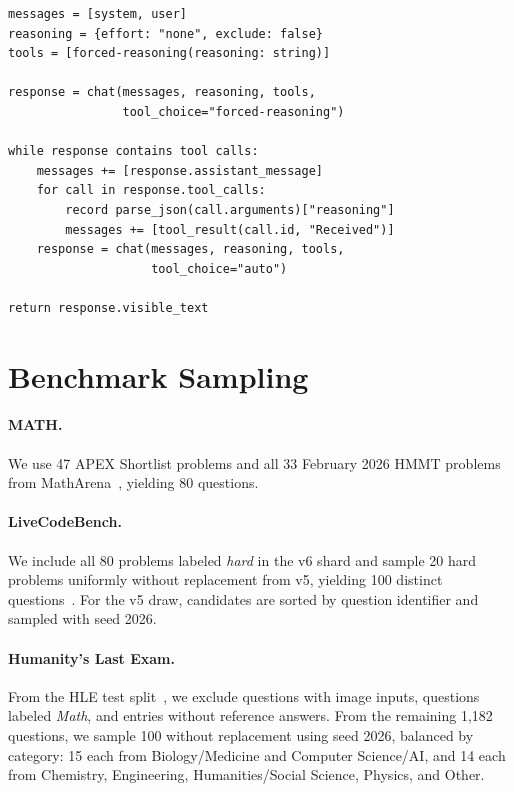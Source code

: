 \begin{tcolorbox}[breakable,colback=black!2,colframe=black!35,
  title={Forced-reasoning protocol (pseudocode)},fonttitle=\bfseries,
  fontupper=\small,before upper={\setlength{\parindent}{0pt}}]
\begin{verbatim}
messages = [system, user]
reasoning = {effort: "none", exclude: false}
tools = [forced-reasoning(reasoning: string)]

response = chat(messages, reasoning, tools,
                tool_choice="forced-reasoning")

while response contains tool calls:
    messages += [response.assistant_message]
    for call in response.tool_calls:
        record parse_json(call.arguments)["reasoning"]
        messages += [tool_result(call.id, "Received")]
    response = chat(messages, reasoning, tools,
                    tool_choice="auto")

return response.visible_text
\end{verbatim}
\end{tcolorbox}

\section{Benchmark Sampling}
\label{app:eval-details}

\paragraph{MATH.}
We use 47 APEX Shortlist problems and all 33 February 2026 HMMT problems from MathArena~\citep{dekoninck2026matharena}, yielding 80 questions.

\paragraph{LiveCodeBench.}
We include all 80 problems labeled \emph{hard} in the v6 shard and sample 20 hard problems uniformly without replacement from v5, yielding 100 distinct questions~\citep{jain2024livecodebench}.
For the v5 draw, candidates are sorted by question identifier and sampled with seed 2026.

\paragraph{Humanity's Last Exam.}
From the HLE test split~\citep{phan2025hle}, we exclude questions with image inputs, questions labeled \emph{Math}, and entries without reference answers.
From the remaining 1,182 questions, we sample 100 without replacement using seed 2026, balanced by category: 15 each from Biology/Medicine and Computer Science/AI, and 14 each from Chemistry, Engineering, Humanities/Social Science, Physics, and Other.

